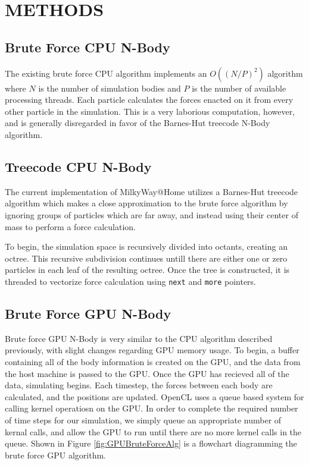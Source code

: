 \documentclass{thesis}
\begin{document}
\chapter{METHODS}
\section{Brute Force CPU N-Body}
The existing brute force CPU algorithm implements an $O((N/P)^2)$ algorithm where $N$ is the number of simulation bodies and $P$ is the number of available processing threads. Each particle calculates the forces enacted on it from every other particle in the simulation. This is a very laborious computation, however, and is generally disregarded in favor of the Barnes-Hut treecode N-Body algorithm.
\section{Treecode CPU N-Body}
The current implementation of MilkyWay@Home utilizes a Barnes-Hut treecode algorithm which makes a close approximation to the brute force algorithm by ignoring groups of particles which are far away, and instead using their center of mass to perform a force calculation.

To begin, the simulation space is recursively divided into octants, creating an octree. This recursive subdivision continues untill there are either one or zero particles in each leaf of the resulting octree. Once the tree is constructed, it is threaded to vectorize force calculation using \texttt{next} and \texttt{more} pointers.
\section{Brute Force GPU N-Body}
Brute force GPU N-Body is very similar to the CPU algorithm described previously, with slight changes regarding GPU memory usage. To begin, a buffer containing all of the body information is created on the GPU, and the data from the host machine is passed to the GPU. Once the GPU has recieved all of the data, simulating begins. Each timestep, the forces between each body are calculated, and the positions are updated. OpenCL uses a queue based system for calling kernel operatiosn on the GPU. In order to complete the required number of time steps for our simulation, we simply queue an appropriate number of kernal calls, and allow the GPU to run until there are no more kernel calls in the queue. Shown in Figure \ref{fig:GPUBruteForceAlg} is a flowchart diagramming the brute force GPU algorithm.
\end{document}
